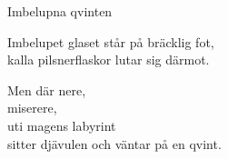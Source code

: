 \begin{song}{Imbelupna qvinten}
	
	
	
	Imbelupet glaset står på bräcklig fot,\\
	kalla pilsnerflaskor lutar sig därmot.
	
	Men där nere,\\
	miserere,\\
	uti magens labyrint\\
	sitter djävulen och väntar på en qvint.
	
\end{song}
